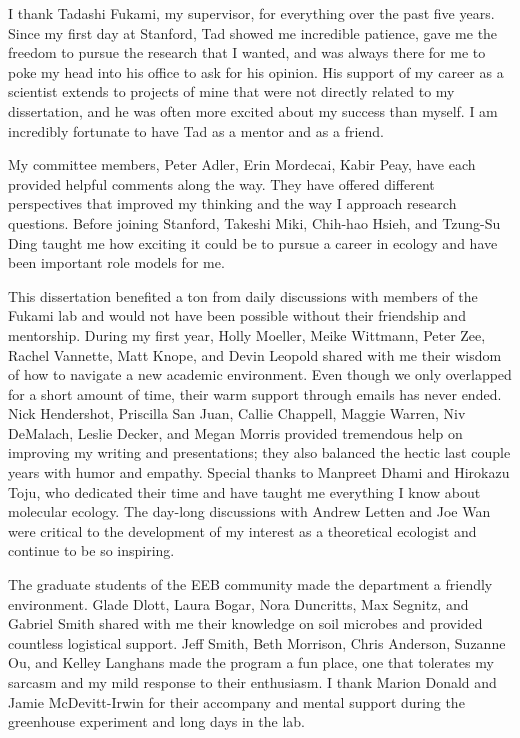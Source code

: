 \doublespacing
I thank Tadashi Fukami, my supervisor, for everything over the past five years. Since my first day at Stanford, Tad showed me incredible patience, gave me the freedom to pursue the research that I wanted, and was always there for me to poke my head into his office to ask for his opinion. 
His support of my career as a scientist extends to projects of mine that were not directly related to my dissertation, and he was often more excited about my success than myself.
I am incredibly fortunate to have Tad as a mentor and as a friend.
\par

 
My committee members, Peter Adler, Erin Mordecai, Kabir Peay, have each provided helpful comments along the way. They have offered different perspectives that improved my thinking and the way I approach research questions. Before joining Stanford, Takeshi Miki, Chih-hao Hsieh, and Tzung-Su Ding taught me how exciting it could be to pursue a career in ecology and have been important role models for me.
\par


This dissertation benefited a ton from daily discussions with members of the Fukami lab and would not have been possible without their friendship and mentorship.
During my first year, Holly Moeller, Meike Wittmann, Peter Zee, Rachel Vannette, Matt Knope, and Devin Leopold shared with me their wisdom of how to navigate a new academic environment. Even though we only overlapped for a short amount of time, their warm support through emails has never ended.
Nick Hendershot, Priscilla San Juan, Callie Chappell, Maggie Warren, Niv DeMalach, Leslie Decker, and Megan Morris provided tremendous help on improving my writing and presentations; they also balanced the hectic last couple years with humor and empathy.
Special thanks to Manpreet Dhami and Hirokazu Toju, who dedicated their time and have taught me everything I know about molecular ecology. The day-long discussions with Andrew Letten and Joe Wan were critical to the development of my interest as a theoretical ecologist and continue to be so inspiring.
\par


The graduate students of the EEB community made the department a friendly environment.
Glade Dlott, Laura Bogar, Nora Duncritts, Max Segnitz, and Gabriel Smith shared with me their knowledge on soil microbes and provided countless logistical support.
Jeff Smith, Beth Morrison, Chris Anderson, Suzanne Ou, and Kelley Langhans made the program a fun place, one that tolerates my sarcasm and my mild response to their enthusiasm. 
I thank Marion Donald and Jamie McDevitt-Irwin for their accompany and mental support during the greenhouse experiment and long days in the lab.
\par


